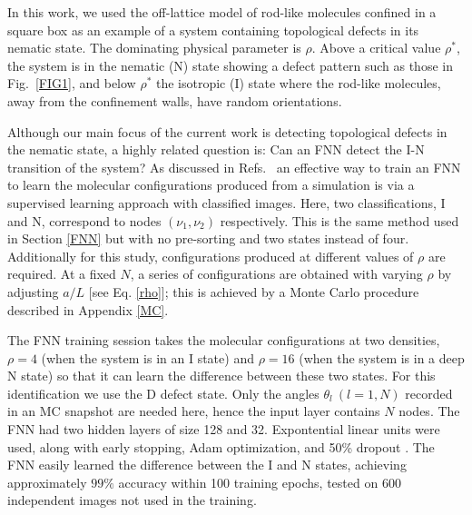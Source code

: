 
In this work, we used the off-lattice model of rod-like molecules confined in a square box as an example of a system containing topological defects in its nematic state. The dominating physical parameter is $\rho$. Above a critical value $\rho^*$, the system is in the nematic (N) state showing a defect pattern such as those in Fig.\ \ref{FIG1}, and
below $\rho^*$ the isotropic (I) state where the rod-like molecules, away from the confinement walls, have random orientations.


Although our main focus of the current work is detecting topological defects in the nematic state, a highly related question is: Can an FNN detect the I-N transition of the system?
As discussed in Refs.\ \cite{carras,wei} an effective way to train an FNN to learn the molecular configurations produced from a simulation is via a supervised learning approach with  classified images. Here, two classifications, I and N, correspond to nodes $(\nu_1, \nu_2)$ respectively.
This is the same method used in Section \ref{FNN} but with no pre-sorting and two states instead of four. Additionally for this study, configurations produced at different values of $\rho$ are required. At a fixed $N$, a series of configurations are obtained with varying $\rho$ by adjusting $a/L$ [see Eq. \eqref{rho}]; this is achieved by a Monte Carlo procedure described in Appendix \ref{MC}.

The FNN training session takes the molecular configurations at two densities, $\rho=4$ (when the system is in an I state) and $\rho=16$ (when the system is in a deep N state) so that it can learn the difference between these two states. For this identification we use the D defect state. Only the angles $\theta_l~(l=1,N)$ recorded in an MC snapshot are needed here, hence the input layer contains $N$ nodes.
The FNN had two hidden layers of size 128 and 32. Expontential linear units were used, along with early stopping, Adam optimization, and 50\% dropout \cite{elu,nntricks,adam,dropout}.
The FNN easily learned the difference between the I and N states, achieving approximately $99\%$ accuracy within 100 training epochs, tested on 600 independent images not used in the training.

